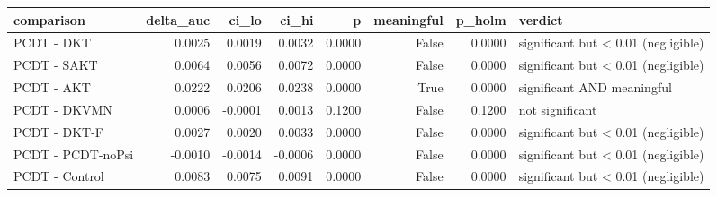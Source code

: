 \begin{tabular}{lrrrrrrl}
\toprule
comparison & delta\_auc & ci\_lo & ci\_hi & p & meaningful & p\_holm & verdict \\
\midrule
PCDT - DKT & 0.0025 & 0.0019 & 0.0032 & 0.0000 & False & 0.0000 & significant but < 0.01 (negligible) \\
PCDT - SAKT & 0.0064 & 0.0056 & 0.0072 & 0.0000 & False & 0.0000 & significant but < 0.01 (negligible) \\
PCDT - AKT & 0.0222 & 0.0206 & 0.0238 & 0.0000 & True & 0.0000 & significant AND meaningful \\
PCDT - DKVMN & 0.0006 & -0.0001 & 0.0013 & 0.1200 & False & 0.1200 & not significant \\
PCDT - DKT-F & 0.0027 & 0.0020 & 0.0033 & 0.0000 & False & 0.0000 & significant but < 0.01 (negligible) \\
PCDT - PCDT-noPsi & -0.0010 & -0.0014 & -0.0006 & 0.0000 & False & 0.0000 & significant but < 0.01 (negligible) \\
PCDT - Control & 0.0083 & 0.0075 & 0.0091 & 0.0000 & False & 0.0000 & significant but < 0.01 (negligible) \\
\bottomrule
\end{tabular}
